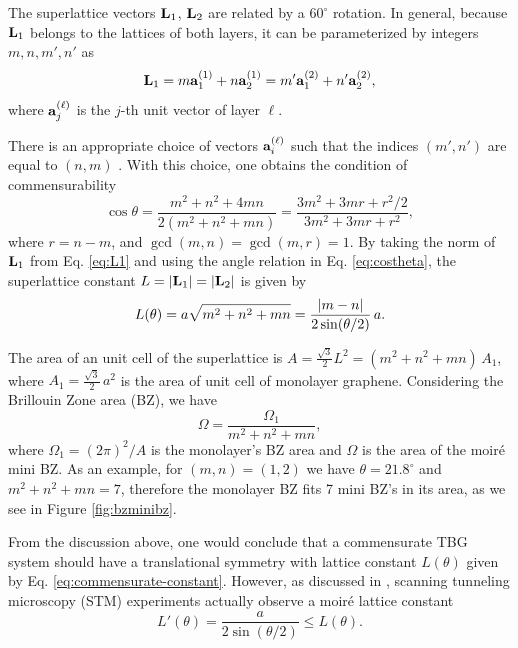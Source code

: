 \documentclass[12pt]{report}
\begin{document}
The superlattice vectors $\vb{L}_1$, $\vb{L}_2$ are related by a $60^\circ$ rotation. In general, because $\vb{L}_1$ belongs to the lattices of both layers, it can be parameterized by integers $m,n,m',n'$ as
\begin{equation} \label{eq:L1}
\vb{L}_1 = m\vb{a}_1^{(1)} + n\vb{a}_2^{(1)} = m'\vb{a}_1^{(2)} + n'\vb{a}_2^{(2)},
\end{equation}
where $\vb{a}_j^{(\ell)}$ is the $j$-th unit vector of layer $\ell$.

There is an appropriate choice of vectors $\vb{a}_i^{(\ell)}$ such that the indices $(m',n')$ are equal to $(n,m)$ \cite{koshino2012}. With this choice, one obtains the condition of commensurability
\begin{equation} \label{eq:costheta}
\cos\theta = \frac{m^2 + n^2 + 4mn}{2(m^2 + n^2 + mn)} = \frac{3 m^2 + 3mr + r^2/2}{3m^2 + 3mr + r^2},
\end{equation}
where $r = n-m$, and $\gcd(m,n) = \gcd(m,r)=1$. By taking the norm of $\vb{L}_1$ from Eq. \eqref{eq:L1} and using the angle relation in Eq. \eqref{eq:costheta}, the superlattice constant $L = \abs{\vb{L}_1} = \abs{\vb{L}_2}$ is given by
\begin{equation} \label{eq:commensurate-constant}
L(\theta) = a\sqrt{m^2 + n^2 + mn} = \frac{\abs{m-n}}{2 \sin(\theta/2)} \, a.
\end{equation}

The area of an unit cell of the superlattice is $A = \frac{\sqrt{3}}{2} L^2 = (m^2 + n^2 + mn) \, A_1$, where $A_1 = \frac{\sqrt{3}}{2} \, a^2$ is the area of unit cell of monolayer graphene. Considering the Brillouin Zone area (BZ), we have
\begin{equation} \label{eq:bz-volume}
\Omega = \frac{\Omega_1}{m^2 + n^2 + mn},
\end{equation}
where $\Omega_1 = (2\pi)^2/A$ is the monolayer's BZ area and $\Omega$ is the area of the moiré mini BZ. As an example, for $(m,n) = (1,2)$ we have $\theta = 21.8^\circ$ and $m^2 + n^2 + mn = 7$, therefore the monolayer BZ fits 7 mini BZ's in its area, as we see in Figure \ref{fig:bzminibz}.

\n

From the discussion above, one would conclude that a commensurate TBG system should have a translational symmetry with lattice constant $L(\theta)$ given by Eq. \eqref{eq:commensurate-constant}. However, as discussed in \cite{zou2018}, scanning tunneling microscopy (STM) experiments actually observe a moiré lattice constant
\begin{equation} \label{eq:STM-constant}
L'(\theta) = \frac{a}{2 \sin(\theta/2)} \leq L(\theta).
\end{equation}
\end{document}
